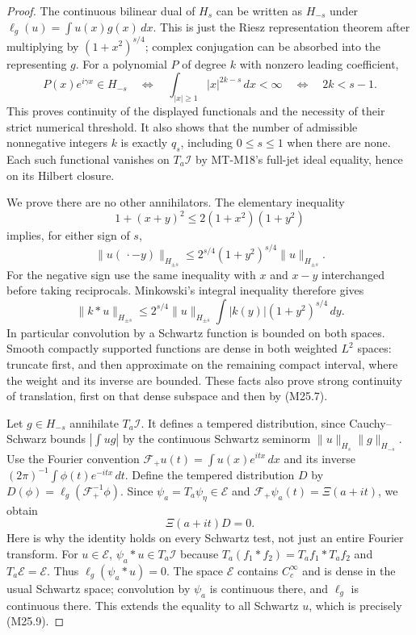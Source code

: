 \begin{proof}
The continuous bilinear dual of $H_s$ can be written as
$H_{-s}$ under $\ell_g(u)=\int u(x)g(x)\,dx$.
This is just the Riesz representation theorem after multiplying
by $(1+x^2)^{s/4}$; complex conjugation can be absorbed into
the representing $g$.
For a polynomial $P$ of degree $k$ with nonzero leading
coefficient,
\[
 P(x)e^{i\gamma x}\in H_{-s}
 \quad\Longleftrightarrow\quad
 \int_{|x|\ge1}|x|^{2k-s}\,dx<\infty
 \quad\Longleftrightarrow\quad 2k<s-1.
 \tag{M25.6}
\]
This proves continuity of the displayed functionals and the
necessity of their strict numerical threshold. It also shows
that the number of admissible nonnegative integers $k$ is
exactly $q_s$, including $0\le s\le1$ when there are none.
Each such functional vanishes on $T_a\mathcal I$ by MT-M18's
full-jet ideal equality, hence on its Hilbert closure.

We prove there are no other annihilators. The elementary
inequality
\[
 1+(x+y)^2\le2(1+x^2)(1+y^2)
\]
implies, for either sign of $s$,
\[
 \|u(\,\cdot-y)\|_{H_{\pm s}}
       \le 2^{s/4}(1+y^2)^{s/4}\|u\|_{H_{\pm s}}.
 \tag{M25.7}
\]
For the negative sign use the same inequality with $x$ and
$x-y$ interchanged before taking reciprocals. Minkowski's
integral inequality therefore gives
\[
 \|k*u\|_{H_{\pm s}}
 \le2^{s/4}\|u\|_{H_{\pm s}}
       \int|k(y)|(1+y^2)^{s/4}\,dy.
 \tag{M25.8}
\]
In particular convolution by a Schwartz function is bounded
on both spaces. Smooth compactly supported functions are
dense in both weighted $L^2$ spaces: truncate first, and then
approximate on the remaining compact interval, where the
weight and its inverse are bounded. These facts also prove
strong continuity of translation, first on that dense subspace
and then by (M25.7).

Let $g\in H_{-s}$ annihilate $T_a\mathcal I$.
It defines a tempered distribution, since Cauchy--Schwarz
bounds $|\int ug|$ by the continuous Schwartz seminorm
$\|u\|_{H_s}\|g\|_{H_{-s}}$.
Use the Fourier convention
$\mathcal F_+u(t)=\int u(x)e^{itx}\,dx$ and its inverse
$(2\pi)^{-1}\int\phi(t)e^{-itx}\,dt$.
Define the tempered distribution $D$ by
$D(\phi)=\ell_g(\mathcal F_+^{-1}\phi)$.
Since $\psi_a=T_a\psi_\eta\in\mathcal E$ and
$\mathcal F_+\psi_a(t)=\Xi(a+it)$, we obtain
\[
                         \Xi(a+it)D=0.
 \tag{M25.9}
\]
Here is why the identity holds on every Schwartz test,
not just an entire Fourier transform. For $u\in\mathcal E$,
$\psi_a*u\in T_a\mathcal I$ because
$T_a(f_1*f_2)=T_af_1*T_af_2$ and $T_a\mathcal E=\mathcal E$.
Thus $\ell_g(\psi_a*u)=0$. The space $\mathcal E$ contains
$C_c^\infty$ and is dense in the usual Schwartz space;
convolution by $\psi_a$ is continuous there, and
$\ell_g$ is continuous there. This extends the equality to
all Schwartz $u$, which is precisely (M25.9).


\end{proof}
